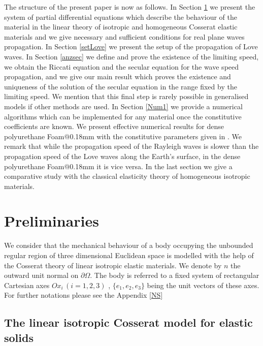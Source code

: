 \documentclass[10pt]{article}
\begin{document}
 The structure  of the present paper is now  {as follows}. In Section \ref{Sp} we  {present} the system  {of} partial differential  {equations} which describe the behaviour of the material in the linear theory of isotropic and homogeneous Cosserat elastic materials and we give  {necessary} and sufficient conditions for real plane waves propagation. In Section \ref{setLove} we present the setup of the propagation of Love waves. In Section \ref{anzsec} we define and prove the existence of the limiting speed, we obtain the Riccati equation and the secular equation for the  {wave} speed propagation, and we give our main result which  {proves} the existence and uniqueness of the solution of the secular equation in the range fixed by the limiting speed. We mention that this final step is  {rarely} possible in generalised models if other methods are used. 
In Section \ref{Num1} we provide a numerical algorithms which can be implemented for any  material once   the constitutive coefficients are known. We present effective  numerical results for  dense polyurethane  {Foam@0.18mm} with the constitutive parameters given in \cite{Lakes83,lakes1987foam}. We remark that while the propagation speed of the Rayleigh waves  is slower than the propagation speed of the Love waves along the Earth's surface, in the dense polyurethane Foam@0.18mm it is vice versa.  In the last section we give a comparative study with the classical elasticity theory of homogeneous isotropic materials.



\section{Preliminaries}\label{Sp}\setcounter{equation}{0}


We consider that the mechanical behaviour of a body occupying  the unbounded regular region of three dimensional Euclidean space  is modelled with the help of the Cosserat theory of  linear isotropic elastic materials. We denote  by $n$ the outward unit normal on $\partial\Omega$. The body is referred to a fixed system of rectangular Cartesian axes  $Ox_i \,(i=1,2,3)$ , $\{e_1, e_2, e_3\}$ being the unit vectors of these axes. For further notations please see the Appendix \ref{NS}

\subsection{The  {linear isotropic} Cosserat model for elastic solids}\label{subsC}
\end{document}
